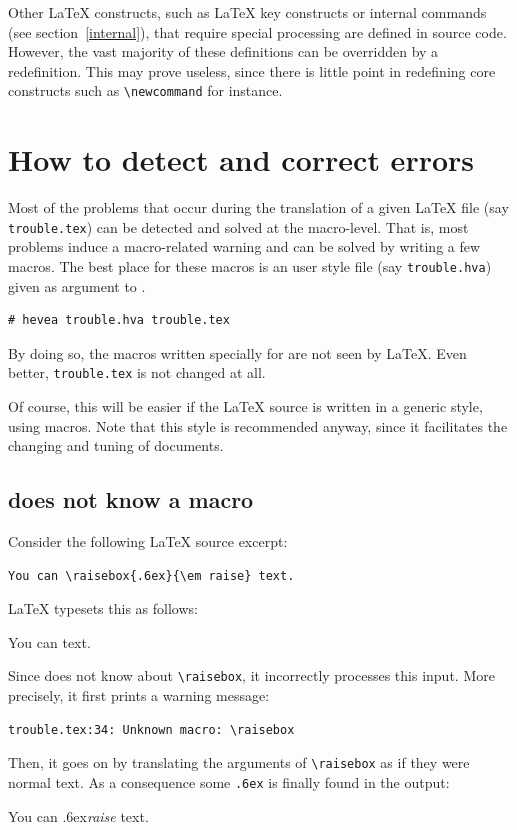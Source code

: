 Other \LaTeX{} constructs, such as
\LaTeX{} key constructs or \hevea{} internal commands (see section~\ref{internal}),
that require special processing are defined
in \hevea{} source code.
However, the vast majority of these definitions can be overridden by a
redefinition.
This may prove useless, since there is little point in
redefining core constructs such as \verb+\newcommand+ for instance.

\section{How to detect and correct errors}\label{trouble}

Most of the problems that occur during the translation of a given
\LaTeX{} file (say \verb+trouble.tex+) can be detected and solved at
the macro-level. That is, most problems induce a macro-related warning
and can be solved by writing a few
macros. The best place for these macros is an user style file (say
\texttt{trouble.hva}) given as
argument to \hevea.
\begin{verbatim}
# hevea trouble.hva trouble.tex
\end{verbatim}
By doing so, the macros written specially for \hevea{} are not
seen by \LaTeX. Even better, \verb+trouble.tex+ is not changed
at all.

Of course, this will be easier if the \LaTeX{} source is written in a
generic style, using macros.
Note that this style is recommended anyway, since it facilitates the changing
and tuning of documents.

\subsection{\hevea{} does not know a macro}\label{dontknow}
Consider the following \LaTeX{} source excerpt:
\begin{verbatim}
You can \raisebox{.6ex}{\em raise} text.
\end{verbatim}

\LaTeX{} typesets this as follows:
\begin{htmlout}
\begin{showlatex}
You can  text.
\end{showlatex}
\end{htmlout}

Since \hevea{} does not know about \verb+\raisebox+,
it incorrectly processes this input. More precisely,
it first prints a warning message:
\begin{verbatim}
trouble.tex:34: Unknown macro: \raisebox
\end{verbatim}
Then, it goes on by translating the arguments of \verb+\raisebox+ as if
they were normal text. As a
consequence some \verb+.6ex+ is finally found in the {\html} output:
\begin{htmlout}
You can .6ex{\em raise} text.
\end{htmlout}

